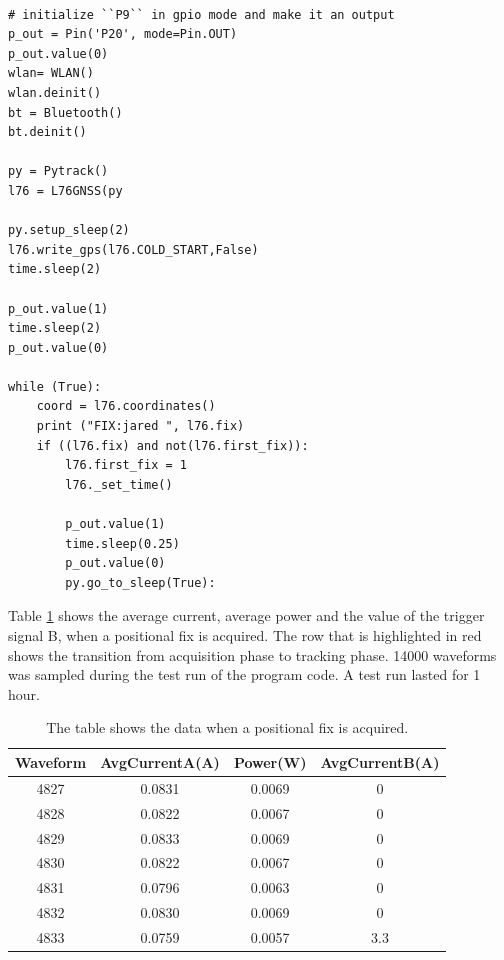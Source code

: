 \lstset{language=Python}          %
\begin{lstlisting}[frame=single, caption= main.py without communication]  % Start your code-block

# initialize ``P9`` in gpio mode and make it an output
p_out = Pin('P20', mode=Pin.OUT)
p_out.value(0)
wlan= WLAN()
wlan.deinit()
bt = Bluetooth()
bt.deinit()

py = Pytrack()
l76 = L76GNSS(py

py.setup_sleep(2)
l76.write_gps(l76.COLD_START,False)
time.sleep(2)

p_out.value(1)
time.sleep(2)
p_out.value(0)

while (True):
    coord = l76.coordinates()
    print ("FIX:jared ", l76.fix)
    if ((l76.fix) and not(l76.first_fix)):
        l76.first_fix = 1
        l76._set_time()

        p_out.value(1)
        time.sleep(0.25)
        p_out.value(0)
        py.go_to_sleep(True):
\end{lstlisting}
\label{code:wifioff}

Table \ref{Table:wifioff} shows the average current, average power and the value of the trigger signal B, when a positional fix is acquired. The row that is highlighted in red shows the transition from acquisition phase to tracking phase. 14000 waveforms was sampled during the test run of the program code. A test run lasted for 1 hour.  


\begin{table}[h!]
\begin{center}
 \begin{tabular}{||c c c c||} 
 \hline
 Waveform & AvgCurrentA(A) & Power(W) & AvgCurrentB(A) \\ [0.5ex] 
 \hline\hline
 4827 & 0.0831 & 0.0069 & 0 \\
 \hline
 4828 & 0.0822 & 0.0067 & 0 \\
 \hline
 4829 & 0.0833 & 0.0069 & 0 \\
 \hline
 4830 & 0.0822 & 0.0067 & 0 \\
 \hline
 4831 & 0.0796 & 0.0063 & 0 \\ 
 \hline
 4832 & 0.0830 & 0.0069 & 0 \\
 \hline
 \rowcolor{red}
 4833 & 0.0759  & 0.0057 & 3.3 \\[1ex]
 \hline
\end{tabular}
\end{center}
\caption{The table shows the data when a positional fix is acquired.}
\label{Table:wifioff}
\end{table}

